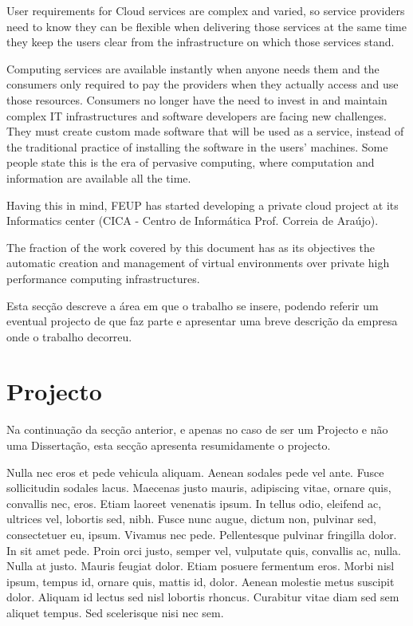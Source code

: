 User requirements for Cloud services are complex and varied, so service providers need to know they can be flexible when delivering those services at the same time they keep the users clear from the infrastructure on which those services stand.

Computing services are available instantly when anyone needs them and the consumers only required to pay the providers when they actually access and use those resources. Consumers no longer have the need to invest in and maintain complex IT infrastructures and software developers are facing new challenges. They must create custom made software that will be used as a service, instead of the traditional practice of installing the software in the users' machines. Some people state this is the era of pervasive computing, where computation and information are available all the time.~\citet{ieees}

Having this in mind, FEUP has started developing a private cloud project at its Informatics center (CICA - Centro de Informática Prof. Correia de Araújo).
	
The fraction of the work covered by this document has as its objectives the automatic creation and management of virtual environments over private high performance computing infrastructures. 





Esta secção descreve a área em que o trabalho se insere, podendo
referir um eventual projecto de que faz parte e apresentar uma breve
descrição da empresa onde o trabalho decorreu.

\section{Projecto} \label{sec:proj}

Na continuação da secção anterior, e apenas no caso de ser um Projecto
e não uma Dissertação, esta secção apresenta resumidamente o projecto.

Nulla nec eros et pede vehicula aliquam. Aenean sodales pede vel
ante. Fusce sollicitudin sodales lacus. Maecenas justo mauris,
adipiscing vitae, ornare quis, convallis nec, eros. Etiam laoreet
venenatis ipsum. In tellus odio, eleifend ac, ultrices vel, lobortis
sed, nibh. Fusce nunc augue, dictum non, pulvinar sed, consectetuer
eu, ipsum. Vivamus nec pede. Pellentesque pulvinar fringilla dolor. In
sit amet pede. Proin orci justo, semper vel, vulputate quis, convallis
ac, nulla. Nulla at justo. Mauris feugiat dolor. Etiam posuere
fermentum eros. Morbi nisl ipsum, tempus id, ornare quis, mattis id,
dolor. Aenean molestie metus suscipit dolor. Aliquam id lectus sed
nisl lobortis rhoncus. Curabitur vitae diam sed sem aliquet
tempus. Sed scelerisque nisi nec sem. 

